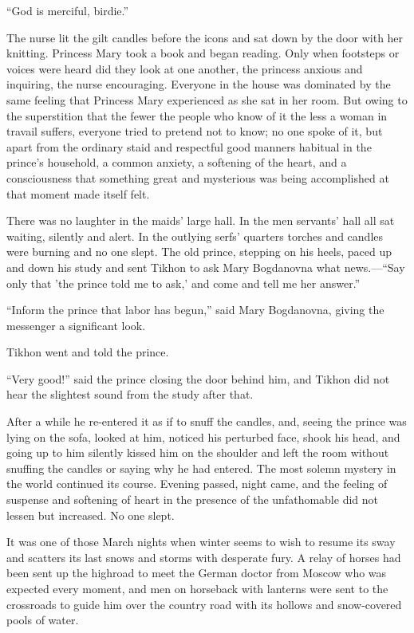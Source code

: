 ``God is merciful, birdie.''

The nurse lit the gilt candles before the icons and sat down by
the door with her knitting. Princess Mary took a book and began
reading. Only when footsteps or voices were heard did they look
at one another, the princess anxious and inquiring, the nurse
encouraging. Everyone in the house was dominated by the same
feeling that Princess Mary experienced as she sat in her
room. But owing to the superstition that the fewer the people who
know of it the less a woman in travail suffers, everyone tried to
pretend not to know; no one spoke of it, but apart from the
ordinary staid and respectful good manners habitual in the
prince's household, a common anxiety, a softening of the heart,
and a consciousness that something great and mysterious was being
accomplished at that moment made itself felt.

There was no laughter in the maids' large hall. In the men
servants' hall all sat waiting, silently and alert. In the
outlying serfs' quarters torches and candles were burning and no
one slept. The old prince, stepping on his heels, paced up and
down his study and sent Tikhon to ask Mary Bogdanovna what
news.---``Say only that 'the prince told me to ask,' and come and
tell me her answer.''

``Inform the prince that labor has begun,'' said Mary Bogdanovna,
giving the messenger a significant look.

Tikhon went and told the prince.

``Very good!'' said the prince closing the door behind him, and
Tikhon did not hear the slightest sound from the study after
that.

After a while he re-entered it as if to snuff the candles, and,
seeing the prince was lying on the sofa, looked at him, noticed
his perturbed face, shook his head, and going up to him silently
kissed him on the shoulder and left the room without snuffing the
candles or saying why he had entered. The most solemn mystery in
the world continued its course.  Evening passed, night came, and
the feeling of suspense and softening of heart in the presence of
the unfathomable did not lessen but increased.  No one slept.

It was one of those March nights when winter seems to wish to
resume its sway and scatters its last snows and storms with
desperate fury. A relay of horses had been sent up the highroad
to meet the German doctor from Moscow who was expected every
moment, and men on horseback with lanterns were sent to the
crossroads to guide him over the country road with its hollows
and snow-covered pools of water.

